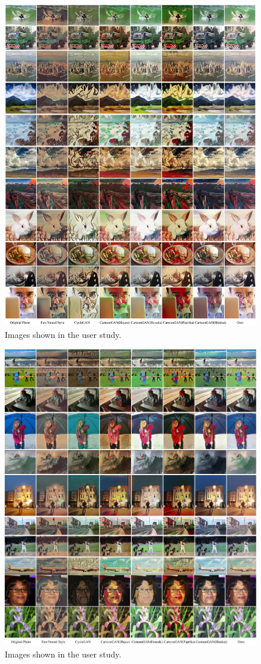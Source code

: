 \documentclass[10pt,twocolumn,letterpaper]{article}
\begin{document}
\begin{figure}[htb]
\centering
\includegraphics[width=\linewidth]{figures/userstudy2.pdf}
\caption{Images shown in the user study.}
\label{fig:userstudy2}
\end{figure}

\begin{figure}[htb]
\centering
\includegraphics[width=\linewidth]{figures/userstudy3.pdf}
\caption{Images shown in the user study.}
\label{fig:userstudy3}
\end{figure}
\end{document}
